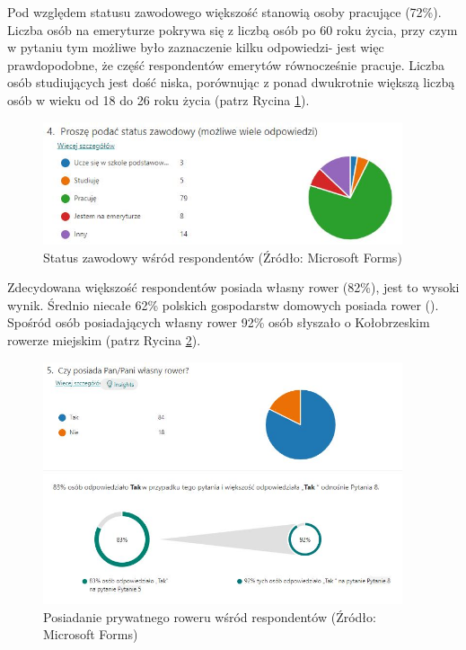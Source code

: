 \documentclass{amuthesis}
\begin{document}
Pod względem statusu zawodowego większość stanowią osoby pracujące (72\%). Liczba osób na emeryturze pokrywa się z liczbą osób po 60 roku życia, przy czym w pytaniu tym możliwe było zaznaczenie kilku odpowiedzi- jest więc prawdopodobne, że część respondentów emerytów równocześnie pracuje. Liczba osób studiujących jest dość niska, porównując z ponad dwukrotnie większą liczbą osób w wieku od 18 do 26 roku życia (patrz Rycina \ref{fig:ankieta4}).

\begin{figure}[t]

{\centering \includegraphics[width=400px]{figures/ankieta/4} 

}

\caption{Status zawodowy wśród respondentów (Źródło: Microsoft Forms)}\label{fig:ankieta4}
\end{figure}

Zdecydowana większość respondentów posiada własny rower (82\%), jest to wysoki wynik. Średnio niecałe 62\% polskich gospodarstw domowych posiada rower (\textcite{gosp_rower}).
Spośród osób posiadających własny rower 92\% osób słyszało o Kołobrzeskim rowerze miejskim (patrz Rycina \ref{fig:ankieta5}).

\begin{figure}[t]

{\centering \includegraphics[width=400px]{figures/ankieta/5} 

}

\caption{Posiadanie prywatnego roweru wśród respondentów (Źródło: Microsoft Forms)}\label{fig:ankieta5}
\end{figure}
\end{document}
